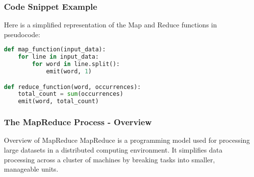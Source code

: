 \documentclass[aspectratio=169]{beamer}
\begin{document}
\begin{frame}[fragile]
    \frametitle{Code Snippet Example}
    Here is a simplified representation of the Map and Reduce functions in pseudocode:
    
    \begin{lstlisting}[language=Python]
def map_function(input_data):
    for line in input_data:
        for word in line.split():
            emit(word, 1)

def reduce_function(word, occurrences):
    total_count = sum(occurrences)
    emit(word, total_count)
    \end{lstlisting}
\end{frame}

\begin{frame}[fragile]
    \frametitle{The MapReduce Process - Overview}
    \begin{block}{Overview of MapReduce}
        MapReduce is a programming model used for processing large datasets in a distributed computing environment. It simplifies data processing across a cluster of machines by breaking tasks into smaller, manageable units.
    \end{block}
\end{frame}
\end{document}
